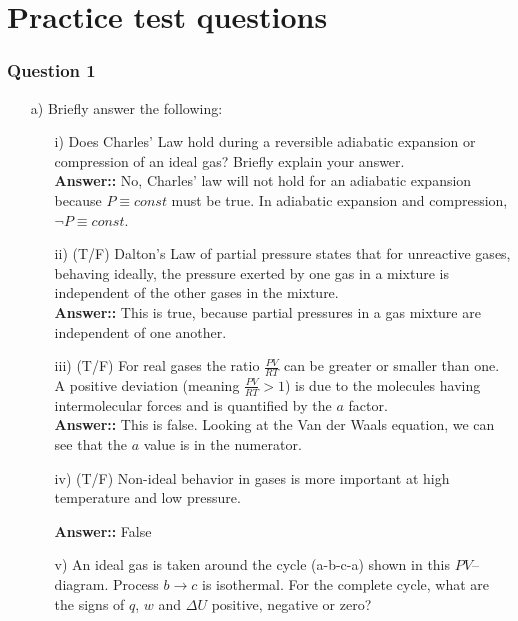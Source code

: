 \documentclass[12pt]{book}
\begin{document}
\chapter*{Practice test questions}

\subsection*{Question 1}

\begin{itemize}
    \item[a)] Briefly answer the following:
        \begin{itemize}
            \item[i)] Does Charles’ Law hold during a reversible adiabatic expansion or compression of an ideal gas?
            Briefly explain your answer.\\

            \textbf{Answer::} No, Charles' law will not hold for an adiabatic expansion because $P\equiv const$ must be true. In adiabatic expansion and compression, $\lnot P\equiv const$.

            \item[ii)] (T/F) Dalton’s Law of partial pressure states that for unreactive gases, behaving ideally, the pressure exerted by one gas in a mixture is independent of the other gases in the mixture.\\
            
            \textbf{Answer::} This is true, because partial pressures in a gas mixture are independent of one another.

            \item[iii)] (T/F) For real gases the ratio $\frac{PV}{RT}$ can be greater or smaller than one.
            A positive deviation (meaning $\frac{PV}{RT} > 1$) is due to the molecules having
            intermolecular forces and is quantified by the $a$ factor.\\

            \textbf{Answer::} This is false. Looking at the Van der Waals equation, we can see that the $a$ value is in the numerator.

            \item[iv)] (T/F) Non-ideal behavior in gases is more important at high temperature
            and low pressure.

            \textbf{Answer::} False

            \item[v)] An ideal gas is taken around the cycle (a-b-c-a) shown in this $PV$–diagram. Process $b \rightarrow c$ is
            isothermal. For the complete cycle, what are the signs of $q$, $w$ and $\Delta U$ positive, negative or zero?\\


\end{itemize}
\end{itemize}
\end{document}

